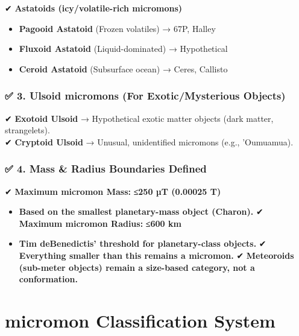 \documentclass[
  letterpaper,
]{book}
\providecommand{\tightlist}{%
  \setlength{\itemsep}{0pt}\setlength{\parskip}{0pt}}
\begin{document}
✔ \textbf{Astatoids (icy/volatile-rich micromons)}

\begin{itemize}
\tightlist
\item
  \textbf{Pagooid Astatoid} (Frozen volatiles) → 67P, Halley
\item
  \textbf{Fluxoid Astatoid} (Liquid-dominated) → Hypothetical
\item
  \textbf{Ceroid Astatoid} (Subsurface ocean) → Ceres, Callisto
\end{itemize}

\subsection{\texorpdfstring{\textbf{✅ 3. Ulsoid micromons (For
Exotic/Mysterious
Objects)}}{✅ 3. Ulsoid micromons (For Exotic/Mysterious Objects)}}\label{ulsoid-micromons-for-exoticmysterious-objects}

✔ \textbf{Exotoid Ulsoid} → Hypothetical exotic matter objects (dark
matter, strangelets).\\
✔ \textbf{Cryptoid Ulsoid} → Unusual, unidentified micromons (e.g.,
'Oumuamua).

\subsection{\texorpdfstring{\textbf{✅ 4. Mass \& Radius Boundaries
Defined}}{✅ 4. Mass \& Radius Boundaries Defined}}\label{mass-radius-boundaries-defined}

✔ \textbf{Maximum micromon Mass:} \textbf{≤250 µT (0.00025 T)}

\begin{itemize}
\tightlist
\item
  \textbf{Based on the smallest planetary-mass object (Charon).} ✔
  \textbf{Maximum micromon Radius:} \textbf{≤600 km}
\item
  \textbf{Tim deBenedictis' threshold for planetary-class objects.} ✔
  \textbf{Everything smaller than this remains a micromon.} ✔
  \textbf{Meteoroids (sub-meter objects) remain a size-based category,
  not a conformation.}
\end{itemize}

\chapter{\texorpdfstring{\textbf{micromon Classification
System}}{micromon Classification System}}\label{micromon-classification-system}
\end{document}
